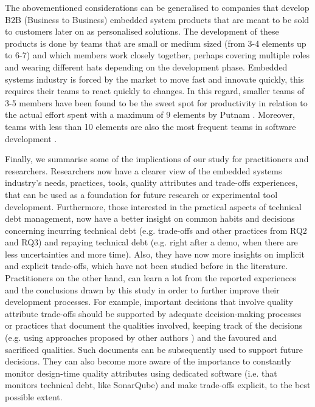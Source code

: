 The abovementioned considerations can be generalised to companies that develop B2B (Business to Business) embedded system products that are meant to be sold to customers later on as personalised solutions.
The development of these products is done by teams that are small or medium sized (from 3-4 elements up to 6-7) and which members work closely together, perhaps covering multiple roles and wearing different hats depending on the development phase.
Embedded systems industry is forced by the market to move fast and innovate quickly, this requires their teams to react quickly to changes. 
In this regard, smaller teams of 3-5 members have been found to be the sweet spot for productivity in relation to the actual effort spent with a maximum of 9 elements by Putnam \cite{Putnam1978}. 
Moreover, teams with less than 10 elements are also the most frequent teams in software development \cite{Rodriguez2012}.

Finally, we summarise some of the implications of our study for practitioners and researchers.
Researchers now have a clearer view of the embedded systems industry's needs, practices, tools, quality attributes and trade-offs experiences, that can be used as a foundation for future research or experimental tool development. 
Furthermore, those interested in the practical aspects of technical debt management, now have a better insight on common habits and decisions concerning incurring technical debt (e.g. trade-offs and other practices from RQ2 and RQ3) and repaying technical debt (e.g. right after a demo, when there are less uncertainties and more time).
Also, they have now more insights on implicit and explicit trade-offs, which have not been studied before in the literature.
Practitioners on the other hand, can learn a lot from the reported experiences and the conclusions drawn by this study in order to further improve their development processes. 
For example, important decisions that involve quality attribute trade-offs should be supported by adequate decision-making processes or practices that document the qualities involved, keeping track of the decisions (e.g. using approaches proposed by other authors \cite{Heesch2012,Falessi2011,Barney2012}) and the favoured and sacrificed qualities.
Such documents can be subsequently used to support future decisions.
They can also become more aware of the importance to constantly monitor design-time quality attributes using dedicated software (i.e. that monitors technical debt, like SonarQube) and make trade-offs explicit, to the best possible extent.

